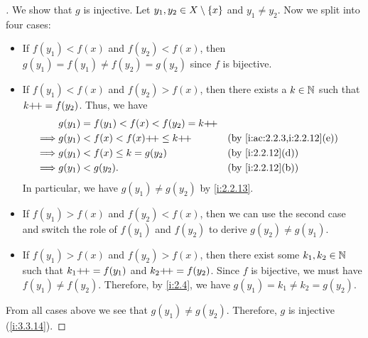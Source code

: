 \begin{proof}[]
  We show that \(g\) is injective.
  Let \(y_1, y_2 \in X \setminus \left\lbrace x\right\rbrace\) and \(y_1 \neq y_2\).
  Now we split into four cases:
  \begin{itemize}
    \item If \(f(y_1) < f(x)\) and \(f(y_2) < f(x)\), then \(g(y_1) = f(y_1) \neq f(y_2) = g(y_2)\) since \(f\) is bijective.
    \item If \(f(y_1) < f(x)\) and \(f(y_2) > f(x)\), then there exists a \(k \in \mathbb{N}\) such that \(k{+}\!{+} = f(y_2)\).
          Thus, we have
          \begin{align*}
                     & g(y_1) = f(y_1) < f(x) < f(y_2) = k\pp                                  \\
            \implies & g(y_1) < f(x) < f(x)\pp \leq k\pp      &  & \by{i:ac:2.2.3,i:2.2.12}[e] \\
            \implies & g(y_1) < f(x) \leq k = g(y_2)          &  & \by{i:2.2.12}[d]            \\
            \implies & g(y_1) < g(y_2).                       &  & \by{i:2.2.12}[b]
          \end{align*}
          In particular, we have \(g(y_1) \neq g(y_2)\) by \cref{i:2.2.13}.
    \item If \(f(y_1) > f(x)\) and \(f(y_2) < f(x)\), then we can use the second case and switch the role of \(f(y_1)\) and \(f(y_2)\) to derive \(g(y_2) \neq g(y_1)\).
    \item If \(f(y_1) > f(x)\) and \(f(y_2) > f(x)\), then there exist some \(k_1, k_2 \in \mathbb{N}\) such that \(k_1{+}\!{+} = f(y_1)\) and \(k_2{+}\!{+} = f(y_2)\).
          Since \(f\) is bijective, we must have \(f(y_1) \neq f(y_2)\).
          Therefore, by \cref{i:2.4}, we have \(g(y_1) = k_1 \neq k_2 = g(y_2)\).
  \end{itemize}
  From all cases above we see that \(g(y_1) \neq g(y_2)\).
  Therefore, \(g\) is injective (\cref{i:3.3.14}).


\end{proof}

